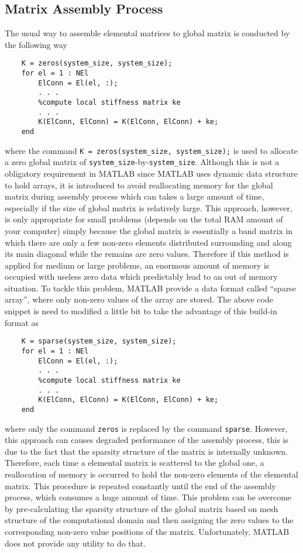 \subsection{Matrix Assembly Process}
The usual way to assemble elemental matrices to global matrix is conducted by the following way
\begin{lstlisting}
    K = zeros(system_size, system_size);
    for el = 1 : NEl
        ElConn = El(el, :);
        . . .
        %compute local stiffness matrix ke
        . . .
        K(ElConn, ElConn) = K(ElConn, ElConn) + ke;
    end
\end{lstlisting}
where the command \lstinline{K = zeros(system_size, system_size);} is used to allocate a zero global matrix of \lstinline{system_size}-by-\lstinline{system_size}. Although this is not a obligatory requirement in MATLAB since MATLAB uses dynamic data structure to hold arrays, it is introduced to avoid reallocating memory for the global matrix during assembly process which can takes a large amount of time, especially if the size of global matrix is relatively large. This approach, however, is only appropriate for small problems (depends on the total RAM amount of your computer) simply because the global matrix is essentially a band matrix in which there are only a few non-zero elements distributed surrounding and along its main diagonal while the remains are zero values. Therefore if this method is applied for medium or large problems, an enormous amount of memory is occupied with useless zero data which predictably lead to an out of memory situation. To tackle this problem, MATLAB provide a data format called ``sparse array'', where only non-zero values of the array are stored. The above code snippet is need to modified a little bit to take the advantage of this build-in format as
\begin{lstlisting}
    K = sparse(system_size, system_size);
    for el = 1 : NEl
        ElConn = El(el, :);
        . . .
        %compute local stiffness matrix ke
        . . .
        K(ElConn, ElConn) = K(ElConn, ElConn) + ke;
    end
\end{lstlisting}
where only the command \lstinline{zeros} is replaced by the command \lstinline{sparse}. However, this approach can causes degraded performance of the assembly process, this is due to the fact that the sparsity structure of the matrix is internally unknown. Therefore, each time a elemental matrix is scattered to the global one, a reallocation of memory is occurred to hold the non-zero elements of the elemental matrix. This procedure is repeated constantly until the end of the assembly process, which consumes a huge amount of time. This problem can be overcome by pre-calculating the sparsity structure of the global matrix based on mesh structure of the computational domain and then assigning the zero values to the corresponding non-zero value positions of the matrix. Unfortunately, MATLAB does not provide any utility to do that.

